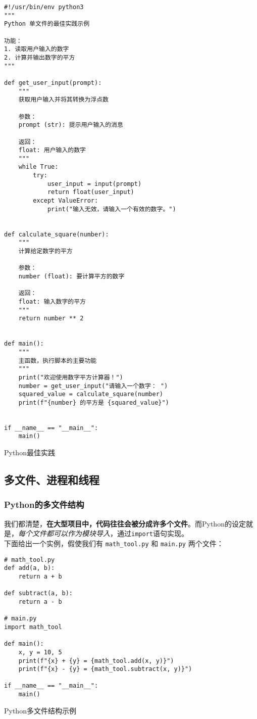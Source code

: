 \begin{longlisting}
    \begin{verbatim}
#!/usr/bin/env python3
"""
Python 单文件的最佳实践示例

功能：
1. 读取用户输入的数字
2. 计算并输出数字的平方
"""

def get_user_input(prompt):
    """
    获取用户输入并将其转换为浮点数

    参数：
    prompt (str): 提示用户输入的消息

    返回：
    float: 用户输入的数字
    """
    while True:
        try:
            user_input = input(prompt)
            return float(user_input)
        except ValueError:
            print("输入无效，请输入一个有效的数字。")


def calculate_square(number):
    """
    计算给定数字的平方

    参数：
    number (float): 要计算平方的数字

    返回：
    float: 输入数字的平方
    """
    return number ** 2


def main():
    """
    主函数，执行脚本的主要功能
    """
    print("欢迎使用数字平方计算器！")
    number = get_user_input("请输入一个数字： ")
    squared_value = calculate_square(number)
    print(f"{number} 的平方是 {squared_value}")


if __name__ == "__main__":
    main()

    \end{verbatim}
    \caption{Python最佳实践}
    \label{listing:pythonbest}
\end{longlisting}

\subsection{多文件、进程和线程}

\subsubsection{Python的多文件结构}

我们都清楚，\textbf{在大型项目中，代码往往会被分成许多个文件}。而Python的设定就是，\textit{每个文件都可以作为模块导入}，通过\texttt{import}语句实现。\\

下面给出一个实例，假使我们有 \texttt{math\_tool.py} 和 \texttt{main.py} 两个文件：

\begin{longlisting}
    \begin{verbatim}
# math_tool.py
def add(a, b):
    return a + b

def subtract(a, b):
    return a - b

# main.py
import math_tool

def main():
    x, y = 10, 5
    print(f"{x} + {y} = {math_tool.add(x, y)}")
    print(f"{x} - {y} = {math_tool.subtract(x, y)}")

if __name__ == "__main__":
    main()
    \end{verbatim}
    \caption{Python多文件结构示例}
    \label{listing:pythonmulti}
\end{longlisting}

